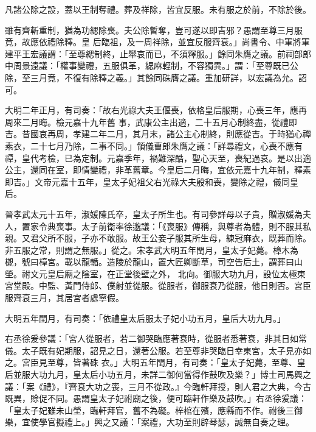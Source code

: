 \begin{pinyinscope}
 凡諸公除之設，蓋以王制奪禮。葬及祥除，皆宜反服。未有服之於前，不除於後。



 雖有齊斬重制，猶為功緦除喪。夫公除暫奪，豈可遂以即吉邪？愚謂至尊三月服竟，故應依禮除釋。皇
 后臨祖，及一周祥除，並宜反服齊衰。」尚書令、中軍將軍建平王宏議謂：「至尊緦制終，止舉哀而已，不須釋服。」餘同朱膺之議。前祠部郎中周景遠議：「權事變禮，五服俱革，緦麻輕制，不容獨異。」謂：「至尊既已公除，至三月竟，不復有除釋之義。」其餘同硃膺之議。重加研詳，以宏議為允。詔可。



 大明二年正月，有司奏：「故右光祿大夫王偃喪，依格皇后服期，心喪三年，應再周來二月晦。檢元嘉十九年舊
 事，武康公主出適，二十五月心制終盡，從禮即吉。昔國哀再周，孝建二年二月，其月末，諸公主心制終，則應從吉。于時猶心禫素衣，二十七月乃除，二事不同。」領儀曹郎朱膺之議：「詳尋禮文，心喪不應有禫，皇代考檢，已為定制。元嘉季年，禍難深酷，聖心天至，喪紀過哀。是以出適公主，還同在室，即情變禮，非革舊章。今皇后二月晦，宜依元嘉十九年制，釋素即吉。」文帝元嘉十五年，皇太子妃祖父右光祿大夫殷和喪，變除之禮，儀同皇后。



 晉孝武太元十五年，淑媛陳氏卒，皇太子所生也。有司參詳母以子貴，贈淑媛為夫人，置家令典喪事。太子前衛率徐邈議：「《喪服》傳稱，與尊者為體，則不服其私親。又君父所不服，子亦不敢服。故王公妾子服其所生母，練冠麻衣，既葬而除。非五服之常，則謂之無服。」從之。宋孝武大明五年閏月，皇太子妃薨。樟木為櫬，號曰樟宮。載以龍輴。造陵於龍山，置大匠卿斷草，司空告后土，謂葬曰山塋。祔文元皇后廟之陰室，在正堂後壁之外，
 北向。御服大功九月，設位太極東宮堂殿。中監、黃門侍郎、僕射並從服。從服者，御服衰乃從服，他日則否。宮臣服齊衰三月，其居宮者處寧假。



 大明五年閏月，有司奏：「依禮皇太后服太子妃小功五月，皇后大功九月。」



 右丞徐爰參議：「宮人從服者，若二御哭臨應著衰時，從服者悉著衰，非其日如常儀。太子既有妃期服，詔見之日，還著公服。若至尊非哭臨日幸東宮，太子見亦如之。宮臣見至尊，皆著硃
 衣。」大明五年閏月，有司奏：「皇太子妃薨，至尊、皇后並服大功九月，皇太后小功五月，未詳二御何當得作鼓吹及樂？」博士司馬興之議：「案《禮》，『齊衰大功之喪，三月不從政。』今臨軒拜授，則人君之大典，今古既異，賒促不同。愚謂皇太子妃祔廟之後，便可臨軒作樂及鼓吹。」右丞徐爰議：「皇太子妃雖未山塋，臨軒拜官，舊不為礙。梓棺在殯，應縣而不作。祔後三御樂，宜使學官擬禮上。」興之又議：「案禮，大功至則辟琴瑟，誠無自奏之理。




\end{pinyinscope}
